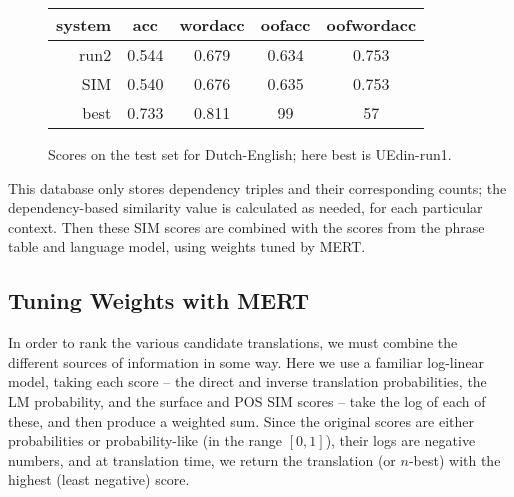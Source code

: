 \documentclass[11pt]{article}
\begin{document}
\begin{figure}[t]
  \begin{center}
  \begin{tabular}{|r|c|c|c|c|}
    \hline
    system & acc      & wordacc  & oofacc & oofwordacc \\
    \hline
    run2        &  0.544      &  0.679  & 0.634   & 0.753    \\
    SIM              &  0.540      &  0.676  & 0.635   & 0.753    \\
    best       &  0.733      &  0.811  & 99      & 57       \\
    \hline
  \end{tabular}
  \end{center}
\caption{Scores on the test set for Dutch-English; here best is UEdin-run1.}
\label{fig:theresults-nl-en}
\end{figure}


This database only stores dependency triples and their corresponding counts;
the dependency-based similarity value is calculated as needed, for each
particular context. Then these SIM scores are combined with the scores from the
phrase table and language model, using weights tuned by MERT.


\subsection{Tuning Weights with MERT}
\label{sec:mert}

In order to rank the various candidate translations, we must combine the
different sources of information in some way.  Here we use a familiar
log-linear model, taking each score -- the direct and inverse translation
probabilities, the LM probability, and the surface and POS SIM scores -- take
the log of each of these, and then produce a weighted sum. Since the original
scores are either probabilities or probability-like (in the range $[0,1]$),
their logs are negative numbers, and at translation time, we return the
translation (or $n$-best) with the highest (least negative) score.
\end{document}
